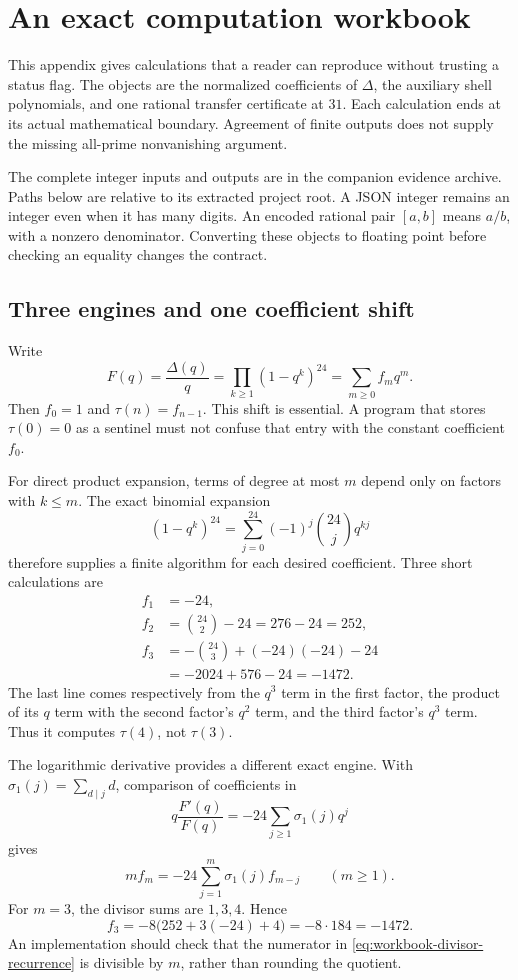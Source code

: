 \chapter{An exact computation workbook}
\label{app:computation-workbook}

This appendix gives calculations that a reader can reproduce without trusting a status flag. The objects are the normalized coefficients of $\Delta$, the auxiliary shell polynomials, and one rational transfer certificate at $31$. Each calculation ends at its actual mathematical boundary. Agreement of finite outputs does not supply the missing all-prime nonvanishing argument.

The complete integer inputs and outputs are in the companion evidence archive. Paths below are relative to its extracted project root. A JSON integer remains an integer even when it has many digits. An encoded rational pair $[a,b]$ means $a/b$, with a nonzero denominator. Converting these objects to floating point before checking an equality changes the contract.

\section{Three engines and one coefficient shift}
\label{sec:workbook-engines}

Write
\[
 F(q)=\frac{\Delta(q)}q=\prod_{k\ge1}(1-q^k)^{24}
      =\sum_{m\ge0}f_mq^m.
\]
Then $f_0=1$ and $\tau(n)=f_{n-1}$. This shift is essential. A program that stores $\tau(0)=0$ as a sentinel must not confuse that entry with the constant coefficient $f_0$.

For direct product expansion, terms of degree at most $m$ depend only on factors with $k\le m$. The exact binomial expansion
\[
 (1-q^k)^{24}=\sum_{j=0}^{24}(-1)^j\binom{24}{j}q^{kj}
\]
therefore supplies a finite algorithm for each desired coefficient. Three short calculations are
\begin{align*}
 f_1&=-24,\\
 f_2&=\binom{24}{2}-24=276-24=252,\\
 f_3&=-\binom{24}{3}+(-24)(-24)-24\\
    &=-2024+576-24=-1472.
\end{align*}
The last line comes respectively from the $q^3$ term in the first factor, the product of its $q$ term with the second factor's $q^2$ term, and the third factor's $q^3$ term. Thus it computes $\tau(4)$, not $\tau(3)$.

The logarithmic derivative provides a different exact engine. With $\sigma_1(j)=\sum_{d\mid j}d$, comparison of coefficients in
\[
 q\frac{F'(q)}{F(q)}=-24\sum_{j\ge1}\sigma_1(j)q^j
\]
gives
\begin{equation}
 m f_m=-24\sum_{j=1}^{m}\sigma_1(j)f_{m-j}
 \qquad(m\ge1).
 \label{eq:workbook-divisor-recurrence}
\end{equation}
For $m=3$, the divisor sums are $1,3,4$. Hence
\[
 f_3=-8\bigl(252+3(-24)+4\bigr)=-8\cdot184=-1472.
\]
An implementation should check that the numerator in \eqref{eq:workbook-divisor-recurrence} is divisible by $m$, rather than rounding the quotient.

